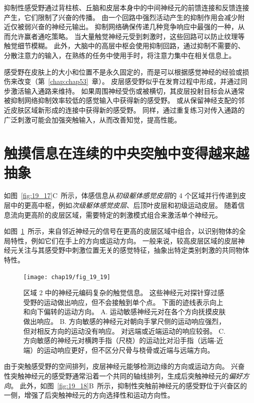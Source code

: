 抑制性感受野通过背柱核、丘脑和皮层本身中的中间神经元的前馈连接和反馈连接产生，它们限制了兴奋的传播。
由一个回路中强烈活动产生的抑制作用会减少附近仅被弱兴奋的神经元输出。
抑制网络确保传递几种竞争响应中最强的一种，从而允许赢者通吃策略。
当大量触觉神经元受到刺激时，这些回路可以防止纹理等触觉细节模糊。
此外，大脑中的高层中枢会使用抑制回路，通过抑制不需要的、分散注意力的输入，在熟练的任务中使用手时，将注意力集中在相关信息上。


感受野在皮肤上的大小和位置不是永久固定的，而是可以根据感觉神经的经验或损伤来改变（第~\ref{chap:chap53}~章）。
皮层感受野似乎在发育过程中形成，并通过同步激活输入通路来维持。
如果周围神经受伤或被横切，其皮层投射目标会从通常被抑制网络抑制效率较低的感觉输入中获得新的感受野。
或从保留神经支配的邻近皮肤区域新形成的连接中获得新的感受野。
同样，通过重复练习对传入通路的广泛刺激可能会加强突触输入，从而改善知觉，提高性能。




\section{触摸信息在连续的中央突触中变得越来越抽象}

如图~\ref{fig:19_17}C~所示，体感信息从\textit{初级躯体感觉皮层}的 4 个区域并行传递到皮层中的更高中枢，例如\textit{次级躯体感觉皮层}、后顶叶皮层和初级运动皮层。
随着信息流向更高阶的皮层区域，需要特定的刺激模式组合来激活单个神经元。


如图~\ref{fig:19_19}~所示，来自邻近神经元的信号在更高的皮层区域中组合，以识别物体的全局特性，例如它们在手上的方向或运动方向。
一般来说，较高皮层区域的皮层神经元关注与其感受野中刺激位置无关的感觉特征，抽象出特定类别刺激的共同物体特性。



\begin{figure}[htbp]
	\centering
	\texttt{[image: chap19/fig\_19\_19]}
	\caption{区域 2 中的神经元编码复杂的触觉信息。 
		这些神经元对探针穿过感受野的运动做出响应，但不会接触到单个点。
		下面的迹线表示向上和向下偏转的运动方向\cite{warren1986objective}。
		A. 运动敏感神经元对在各个方向抚摸皮肤做出响应。
		B. 方向敏感的神经元对朝向手掌尺侧的运动响应强烈，但对相反方向的运动没有响应。
		对远端或近端运动的响应较弱。
		C. 方向敏感的神经元对横跨手指（尺桡）的运动比对沿手指（远端-近端）的运动响应更好，但不区分尺骨与桡骨或近端与远端方向。}
	\label{fig:19_19}
\end{figure}


由于突触感受野的空间排列，皮层神经元能够检测边缘的方向或运动方向。
兴奋性突触神经元的感受野通常沿着一个共同的轴线排列，生成后突触神经元的\textit{偏好方向}。
此外，如图~\ref{fig:19_18}B~所示，抑制性突触前神经元的感受野位于兴奋区的一侧，增强了后突触神经元的方向选择性和运动方向性。



